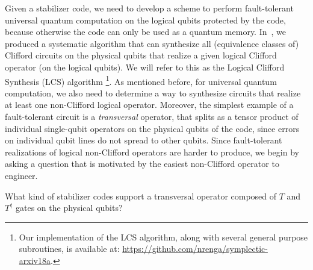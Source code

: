 \documentclass[twoside,romanappendices]{IEEEtran}
\begin{document}
Given a stabilizer code, we need to develop a scheme to perform fault-tolerant universal quantum computation on the logical qubits protected by the code, because otherwise the code can only be used as a quantum memory.
In~\cite{Rengaswamy-arxiv18}, we produced a systematic algorithm that can synthesize all (equivalence classes of) Clifford circuits on the physical qubits that realize a given logical Clifford operator (on the logical qubits).
We will refer to this as the Logical Clifford Synthesis (LCS) algorithm%
\footnote{Our implementation of the LCS algorithm, along with several general purpose subroutines, is available at: \url{https://github.com/nrenga/symplectic-arxiv18a}.}.
As mentioned before, for universal quantum computation, we also need to determine a way to synthesize circuits that realize at least one non-Clifford logical operator.
Moreover, the simplest example of a fault-tolerant circuit is a \emph{transversal} operator, that splits as a tensor product of individual single-qubit operators on the physical qubits of the code, since errors on individual qubit lines do not spread to other qubits.
Since fault-tolerant realizations of logical non-Clifford operators are harder to produce, we begin by asking a question that is motivated by the easiest non-Clifford operator to engineer.

\begin{center}
What kind of stabilizer codes support a transversal operator composed of $T$ and $T^{\dagger}$ gates on the physical qubits?
\end{center}
\end{document}
